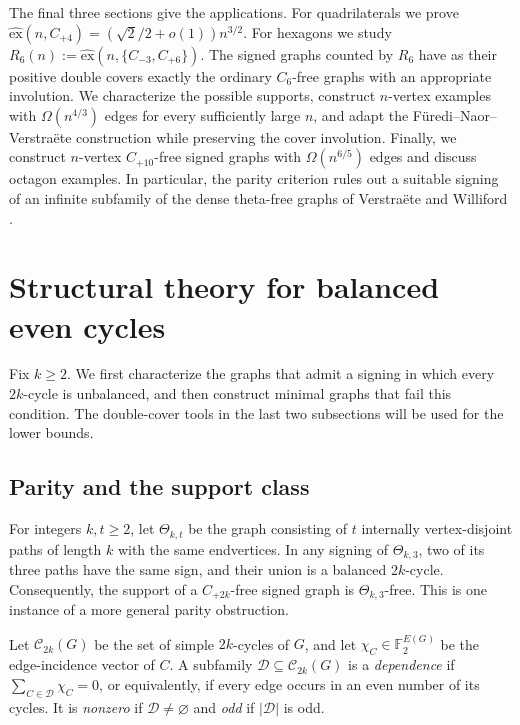 \documentclass{article}
\newcommand{\ex}{\mathrm{ex}}
\newcommand{\hex}{\widehat{\ex}}
\newcommand{\FF}{\mathbb{F}}
\theoremstyle{definition}
\theoremstyle{remark}
\begin{document}
The final three sections give the applications.  For quadrilaterals we prove
$\hex(n,C_{+4})=(\sqrt2/2+o(1))n^{3/2}$.  For hexagons we study
$R_6(n):=\hex(n,\{C_{-3},C_{+6}\})$.  The signed graphs counted by
$R_6$ have as their positive double covers exactly the ordinary $C_6$-free
graphs with an appropriate involution.  We characterize the possible
supports, construct $n$-vertex examples with $\Omega(n^{4/3})$ edges for
every sufficiently large $n$, and adapt the F\"uredi--Naor--Verstra\"ete
construction while
preserving the cover involution.  Finally, we construct $n$-vertex
$C_{+10}$-free signed graphs with $\Omega(n^{6/5})$ edges and discuss
octagon examples.  In particular, the
parity criterion rules out a suitable signing of an infinite subfamily
of the dense theta-free graphs of Verstra\"ete and Williford \cite{VW2019}.

\section{Structural theory for balanced even cycles}\label{sec:structural-tools}

Fix $k\geq2$.  We first characterize the graphs that admit a signing in
which every $2k$-cycle is unbalanced, and then construct minimal graphs
that fail this condition.  The double-cover tools in the last two
subsections will be used for the lower bounds.

\subsection{Parity and the support class}

For integers $k,t\geq2$, let $\Theta_{k,t}$ be the graph consisting of $t$ internally
vertex-disjoint paths of length $k$ with the same endvertices.  In any
signing of $\Theta_{k,3}$, two of its three paths have the same sign, and
their union is a balanced $2k$-cycle.  Consequently, the support of a
$C_{+2k}$-free signed graph is $\Theta_{k,3}$-free.  This is one instance
of a more general parity obstruction.

Let $\mathcal C_{2k}(G)$ be the set of simple $2k$-cycles of $G$, and let
$\chi_C\in\FF_2^{E(G)}$ be the edge-incidence vector of $C$.  A subfamily
$\mathcal D\subseteq\mathcal C_{2k}(G)$ is a \emph{dependence} if
$\sum_{C\in\mathcal D}\chi_C=0$, or equivalently, if every edge occurs
in an even number of its cycles.  It is \emph{nonzero} if
$\mathcal D\ne\varnothing$ and \emph{odd} if $|\mathcal D|$ is odd.
\end{document}
